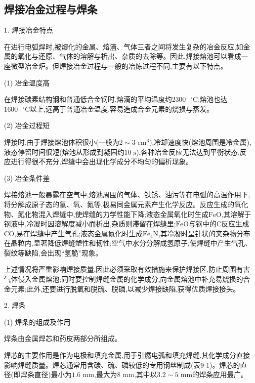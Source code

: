 \documentclass[UTF8]{ctexbook}
\newcommand{\◎}{\ensuremath{\bigcirc}}
\begin{document}
\subsection{焊接冶金过程与焊条}

1. 焊接冶金特点

在进行电弧焊时,被熔化的金属、熔渣、气体三者之间将发生复杂的冶金反应,如金属的氧化与还原、气体的溶解与析出、杂质的去除等。因此,焊接熔池可以看成一座微型冶金炉。但焊接冶金过程与一般的冶炼过程不同,主要有以下特点。

(1) 冶金温度高

在焊接碳素结构钢和普通低合金钢时,熔滴的平均温度约$2300 \text{ }^\circ\text{C}$,熔池也达$1600 \text{ }^\circ\text{C}$以上,远高于普通冶金温度,容易造成合金元素的烧损与蒸发。

(2) 冶金过程短

焊接时,由于焊接熔池体积很小(一般为$2 \sim 3 \text{ cm}^3$),冷却速度快(熔池周围是冷金属),液态停留时间很短(熔池从形成到凝固约$10 \text{ s}$),各种冶金反应无法达到平衡状态,反应进行得很不充分,焊缝中会出现化学成分不均匀的偏析现象。

(3) 冶金条件差

焊接熔池一般暴露在空气中,熔池周围的气体、铁锈、油污等在电弧的高温作用下,将分解成原子态的氢、氧、氮等,极易同金属元素产生化学反应。反应生成的氧化物、氮化物混入焊缝中,使焊缝的力学性能下降;液态金属氧化时生成$\text{FeO}$,其溶解于钢液中,冷凝时因溶解度减小而析出,杂质则滞留在焊缝里;$\text{FeO}$与钢中的$\text{C}$反应生成$\text{CO}$,易在焊缝中产生气孔;液态金属氮化时生成$\text{Fe}_4\text{N}$,其冷凝时呈针状的夹杂物分布在晶粒内,显著降低焊缝塑性和韧性;空气中水分分解成氢原子,使焊缝中产生气孔、裂纹等缺陷,会出现“氢脆”现象。

上述情况将严重影响焊接质量,因此必须采取有效措施来保护焊接区,防止周围有害气体侵入金属熔池;同时要控制焊缝金属的化学成分,向金属熔池中补充易烧损的合金元素;此外,还要进行脱氧和脱硫、脱磷,以减少焊接缺陷,获得优质焊接接头。

2. 焊条

(1) 焊条的组成及作用

焊条由金属焊芯和药皮两部分所组成。

焊芯的主要作用是作为电极和填充金属,用于引燃电弧和填充焊缝,其化学成分直接影响焊缝质量。焊芯通常用含碳、硫、磷较低的专用钢丝制成(表9-1)。焊芯的直径(即焊条直径)最小为$1.6 \text{ mm}$,最大为$8 \text{ mm}$,其中以$3.2 \sim 5 \text{ mm}$的焊条应用最广。
\end{document}
